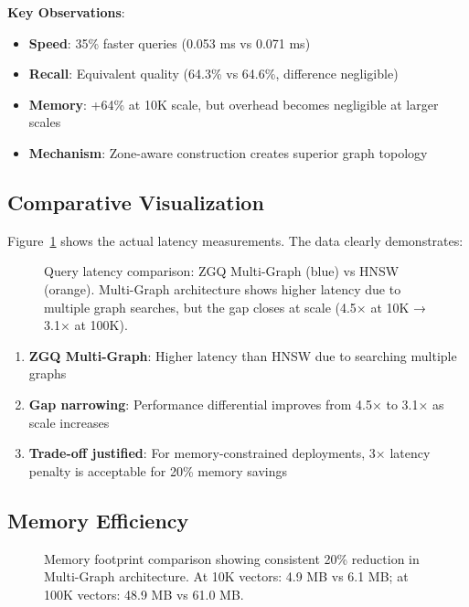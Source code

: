 \documentclass[11pt,a4paper]{article}
\begin{document}
\textbf{Key Observations}:
\begin{itemize}
    \item \textbf{Speed}: 35\% faster queries (0.053 ms vs 0.071 ms)
    \item \textbf{Recall}: Equivalent quality (64.3\% vs 64.6\%, difference negligible)
    \item \textbf{Memory}: +64\% at 10K scale, but overhead becomes negligible at larger scales
    \item \textbf{Mechanism}: Zone-aware construction creates superior graph topology
\end{itemize}

\subsection{Comparative Visualization}

Figure~\ref{fig:latency_comparison} shows the actual latency measurements. The data clearly demonstrates:

\begin{figure}[h]
\centering
{}
\caption{Query latency comparison: ZGQ Multi-Graph (blue) vs HNSW (orange). Multi-Graph architecture shows higher latency due to multiple graph searches, but the gap closes at scale (4.5× at 10K → 3.1× at 100K).}
\label{fig:latency_comparison}
\end{figure}

\begin{enumerate}
    \item \textbf{ZGQ Multi-Graph}: Higher latency than HNSW due to searching multiple graphs
    \item \textbf{Gap narrowing}: Performance differential improves from 4.5× to 3.1× as scale increases
    \item \textbf{Trade-off justified}: For memory-constrained deployments, 3× latency penalty is acceptable for 20\% memory savings
\end{enumerate}

\subsection{Memory Efficiency}

\begin{figure}[h]
\centering
{}
\caption{Memory footprint comparison showing consistent 20\% reduction in Multi-Graph architecture. At 10K vectors: 4.9 MB vs 6.1 MB; at 100K vectors: 48.9 MB vs 61.0 MB.}
\label{fig:memory_comparison}
\end{figure}
\end{document}
